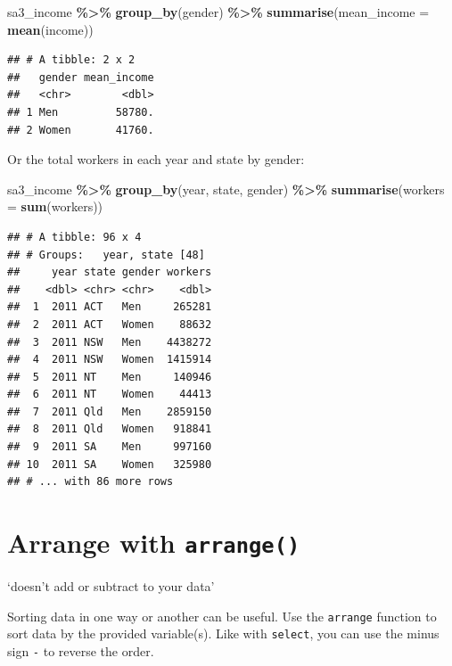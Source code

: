 \documentclass[
]{book}
\newenvironment{Shaded}{\begin{snugshade}}{\end{snugshade}}
\newcommand{\DataTypeTok}[1]{\textcolor[rgb]{0.13,0.29,0.53}{#1}}
\newcommand{\KeywordTok}[1]{\textcolor[rgb]{0.13,0.29,0.53}{\textbf{#1}}}
\newcommand{\NormalTok}[1]{#1}
\newcommand{\OperatorTok}[1]{\textcolor[rgb]{0.81,0.36,0.00}{\textbf{#1}}}
\newcommand{\StringTok}[1]{\textcolor[rgb]{0.31,0.60,0.02}{#1}}
\begin{document}
\begin{Shaded}
\begin{Highlighting}[]
\NormalTok{sa3\_income }\OperatorTok{\%\textgreater{}\%}\StringTok{ }
\StringTok{  }\KeywordTok{group\_by}\NormalTok{(gender) }\OperatorTok{\%\textgreater{}\%}\StringTok{ }
\StringTok{  }\KeywordTok{summarise}\NormalTok{(}\DataTypeTok{mean\_income =} \KeywordTok{mean}\NormalTok{(income))}
\end{Highlighting}
\end{Shaded}

\begin{verbatim}
## # A tibble: 2 x 2
##   gender mean_income
##   <chr>        <dbl>
## 1 Men         58780.
## 2 Women       41760.
\end{verbatim}

Or the total workers in each year and state by gender:

\begin{Shaded}
\begin{Highlighting}[]
\NormalTok{sa3\_income }\OperatorTok{\%\textgreater{}\%}\StringTok{ }
\StringTok{  }\KeywordTok{group\_by}\NormalTok{(year, state, gender) }\OperatorTok{\%\textgreater{}\%}\StringTok{ }
\StringTok{  }\KeywordTok{summarise}\NormalTok{(}\DataTypeTok{workers =} \KeywordTok{sum}\NormalTok{(workers))}
\end{Highlighting}
\end{Shaded}

\begin{verbatim}
## # A tibble: 96 x 4
## # Groups:   year, state [48]
##     year state gender workers
##    <dbl> <chr> <chr>    <dbl>
##  1  2011 ACT   Men     265281
##  2  2011 ACT   Women    88632
##  3  2011 NSW   Men    4438272
##  4  2011 NSW   Women  1415914
##  5  2011 NT    Men     140946
##  6  2011 NT    Women    44413
##  7  2011 Qld   Men    2859150
##  8  2011 Qld   Women   918841
##  9  2011 SA    Men     997160
## 10  2011 SA    Women   325980
## # ... with 86 more rows
\end{verbatim}

\hypertarget{arrange-with-arrange}{%
\section{\texorpdfstring{Arrange with \texttt{arrange()}}{Arrange with arrange()}}\label{arrange-with-arrange}}

`doesn't add or subtract to your data'

Sorting data in one way or another can be useful. Use the \texttt{arrange} function to sort data by the provided variable(s). Like with \texttt{select}, you can use the minus sign \texttt{-} to reverse the order.
\end{document}
